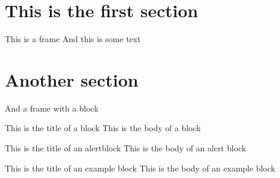 \documentclass[xcolor=svgnames]{beamer}
\begin{document}
{ 

}

\section{This is the first section} 

\begin{frame}{This is a frame}
    And this is some text
\end{frame}


\section{Another section}

\begin{frame}{And a frame with a block}
    \begin{block}{This is the title of a block}
    This is the body of a block 
    \end{block}

    \begin{alertblock}{This is the title of an alertblock}
    This is the body of an alert block 
    \end{alertblock}

    \begin{exampleblock}{This is the title of an example block}
    This is the body of an example block 
    \end{exampleblock}

\end{frame}
\end{document}
